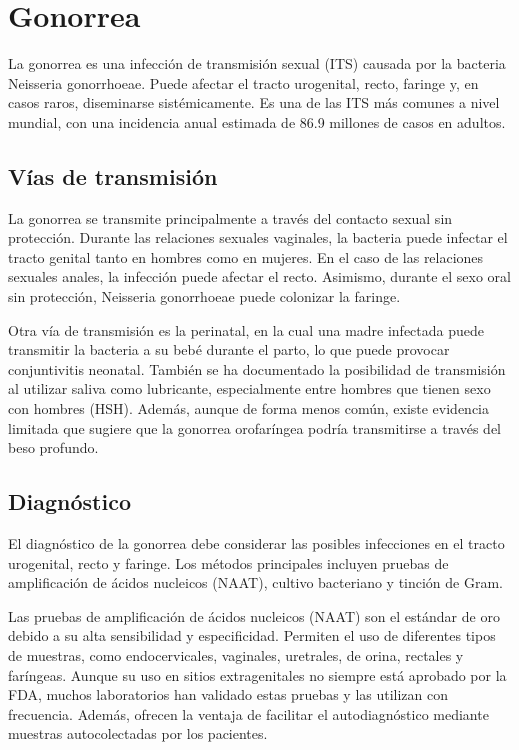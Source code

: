 \section{Gonorrea}
La gonorrea es una infección de transmisión sexual (ITS) causada por la bacteria Neisseria gonorrhoeae. Puede afectar el tracto urogenital, recto, faringe y, en casos raros, diseminarse sistémicamente. Es una de las ITS más comunes a nivel mundial, con una incidencia anual estimada de 86.9 millones de casos en adultos.

\subsection{Vías de transmisión}
La gonorrea se transmite principalmente a través del contacto sexual sin protección. Durante las relaciones sexuales vaginales, la bacteria puede infectar el tracto genital tanto en hombres como en mujeres. En el caso de las relaciones sexuales anales, la infección puede afectar el recto. Asimismo, durante el sexo oral sin protección, Neisseria gonorrhoeae puede colonizar la faringe.

Otra vía de transmisión es la perinatal, en la cual una madre infectada puede transmitir la bacteria a su bebé durante el parto, lo que puede provocar conjuntivitis neonatal. También se ha documentado la posibilidad de transmisión al utilizar saliva como lubricante, especialmente entre hombres que tienen sexo con hombres (HSH). Además, aunque de forma menos común, existe evidencia limitada que sugiere que la gonorrea orofaríngea podría transmitirse a través del beso profundo.

\subsection{Diagnóstico}
El diagnóstico de la gonorrea debe considerar las posibles infecciones en el tracto urogenital, recto y faringe. Los métodos principales incluyen pruebas de amplificación de ácidos nucleicos (NAAT), cultivo bacteriano y tinción de Gram.

Las pruebas de amplificación de ácidos nucleicos (NAAT) son el estándar de oro debido a su alta sensibilidad y especificidad. Permiten el uso de diferentes tipos de muestras, como endocervicales, vaginales, uretrales, de orina, rectales y faríngeas. Aunque su uso en sitios extragenitales no siempre está aprobado por la FDA, muchos laboratorios han validado estas pruebas y las utilizan con frecuencia. Además, ofrecen la ventaja de facilitar el autodiagnóstico mediante muestras autocolectadas por los pacientes.

